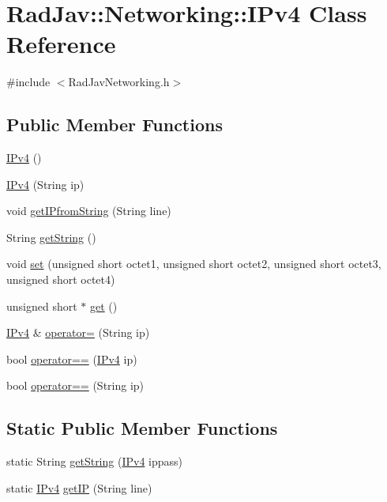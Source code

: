 \hypertarget{class_rad_jav_1_1_networking_1_1_i_pv4}{}\section{Rad\+Jav\+:\+:Networking\+:\+:I\+Pv4 Class Reference}
\label{class_rad_jav_1_1_networking_1_1_i_pv4}


{\ttfamily \#include $<$Rad\+Jav\+Networking.\+h$>$}

\subsection*{Public Member Functions}
\begin{DoxyCompactItemize}
\item 
\hyperlink{class_rad_jav_1_1_networking_1_1_i_pv4_a3ac8886c263004c4ec9ce7d4f6697c0e}{I\+Pv4} ()
\item 
\hyperlink{class_rad_jav_1_1_networking_1_1_i_pv4_ab1c4a2963bc1373246fbd37de616d1a2}{I\+Pv4} (String ip)
\item 
void \hyperlink{class_rad_jav_1_1_networking_1_1_i_pv4_a5cdc69df701a2e20cd7332533d498858}{get\+I\+Pfrom\+String} (String line)
\item 
String \hyperlink{class_rad_jav_1_1_networking_1_1_i_pv4_ab07c3471790f96f639aee32cae8ade56}{get\+String} ()
\item 
void \hyperlink{class_rad_jav_1_1_networking_1_1_i_pv4_a524d7571e9ca35924655e32c4e58e4c4}{set} (unsigned short octet1, unsigned short octet2, unsigned short octet3, unsigned short octet4)
\item 
unsigned short $\ast$ \hyperlink{class_rad_jav_1_1_networking_1_1_i_pv4_aac66ee4871e0129739f6fb5c2e2ef789}{get} ()
\item 
\hyperlink{class_rad_jav_1_1_networking_1_1_i_pv4}{I\+Pv4} \& \hyperlink{class_rad_jav_1_1_networking_1_1_i_pv4_a60081f8e4e3e38bc03606d2e8a2ce6c3}{operator=} (String ip)
\item 
bool \hyperlink{class_rad_jav_1_1_networking_1_1_i_pv4_ae527d09641829f2b14c43dd738c6225f}{operator==} (\hyperlink{class_rad_jav_1_1_networking_1_1_i_pv4}{I\+Pv4} ip)
\item 
bool \hyperlink{class_rad_jav_1_1_networking_1_1_i_pv4_a6517697e6a2a11938a284151d34f4041}{operator==} (String ip)
\end{DoxyCompactItemize}
\subsection*{Static Public Member Functions}
\begin{DoxyCompactItemize}
\item 
static String \hyperlink{class_rad_jav_1_1_networking_1_1_i_pv4_a128a5e94046076601e7da049c7585c8f}{get\+String} (\hyperlink{class_rad_jav_1_1_networking_1_1_i_pv4}{I\+Pv4} ippass)
\item 
static \hyperlink{class_rad_jav_1_1_networking_1_1_i_pv4}{I\+Pv4} \hyperlink{class_rad_jav_1_1_networking_1_1_i_pv4_ae1e8cb605b1be63e10c189b6c1e693aa}{get\+IP} (String line)
\end{DoxyCompactItemize}
